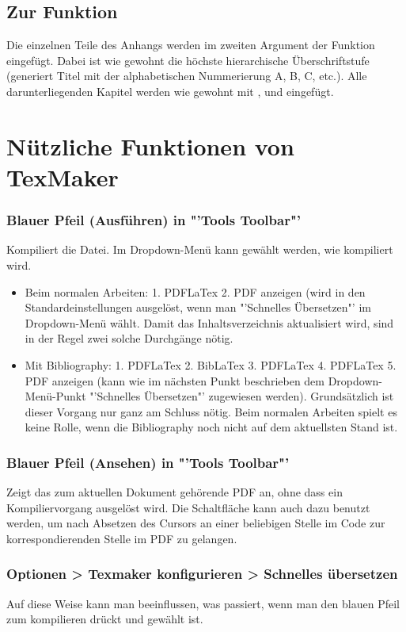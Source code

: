 \subsection{Zur Funktion }%
%
Die einzelnen Teile des Anhangs werden im zweiten Argument der Funktion   eingefügt. Dabei ist  wie gewohnt die höchste hierarchische Überschriftstufe (generiert Titel mit der alphabetischen Nummerierung A, B, C, etc.). Alle darunterliegenden Kapitel werden wie gewohnt mit  ,   und   eingefügt.%
%
\section{Nützliche Funktionen von TexMaker}%
%
\subsubsection{Blauer Pfeil (Ausführen) in "'Tools Toolbar"'}%
%
Kompiliert die Datei. Im Dropdown-Menü kann gewählt werden, wie kompiliert wird. %
\begin{itemize}%
\item Beim normalen Arbeiten: 1.  PDFLaTex 2. PDF anzeigen (wird in den Standardeinstellungen ausgelöst, wenn man "'Schnelles Übersetzen"' im Dropdown-Menü wählt. Damit das Inhaltsverzeichnis aktualisiert wird, sind in der Regel zwei solche Durchgänge nötig.%
\item Mit Bibliography: 1. PDFLaTex 2. BibLaTex 3. PDFLaTex 4. PDFLaTex 5. PDF anzeigen (kann wie im nächsten Punkt beschrieben dem Dropdown-Menü-Punkt "'Schnelles Übersetzen"' zugewiesen werden).  Grundsätzlich ist dieser Vorgang nur ganz am Schluss nötig. Beim normalen Arbeiten spielt es keine Rolle, wenn die Bibliography noch nicht auf dem aktuellsten Stand ist.%
\end{itemize}%
%
\subsubsection{Blauer Pfeil (Ansehen) in "'Tools Toolbar"'}%
%
Zeigt das zum aktuellen Dokument gehörende PDF an, ohne dass ein Kompiliervorgang ausgelöst wird. Die Schaltfläche kann auch dazu benutzt werden, um nach Absetzen des Cursors an einer beliebigen Stelle im Code zur korrespondierenden Stelle im PDF zu gelangen.%
%
\subsubsection{Optionen > Texmaker konfigurieren > Schnelles übersetzen}%
%
Auf diese Weise kann man beeinflussen, was passiert, wenn man den blauen Pfeil zum kompilieren drückt und  gewählt ist.%
%
